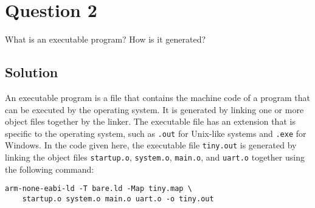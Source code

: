 \section*{Question 2}

What is an executable program?
How is it generated?

\subsection*{Solution}

An executable program is a file that contains the machine code of a program that can be executed by the operating system.
It is generated by linking one or more object files together by the linker.
The executable file has an extension that is specific to the operating system, such as \texttt{.out} for Unix-like systems and \texttt{.exe} for Windows.
In the code given here, the executable file \texttt{tiny.out} is generated by linking the object files \texttt{startup.o}, \texttt{system.o}, \texttt{main.o}, and \texttt{uart.o} together using the following command:
\begin{verbatim}
arm-none-eabi-ld -T bare.ld -Map tiny.map \
    startup.o system.o main.o uart.o -o tiny.out
\end{verbatim}

